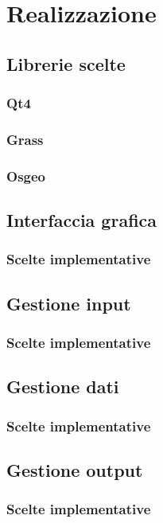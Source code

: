 
\chapter{Realizzazione}
\label{cap:realizzazione}

\section{Librerie scelte}

\subsection{Qt4}

\subsection{Grass}

\subsection{Osgeo}

\section{Interfaccia grafica}

\subsection{Scelte implementative}

\section{Gestione input}

\subsection{Scelte implementative}

\section{Gestione dati}

\subsection{Scelte implementative}

\section{Gestione output}

\subsection{Scelte implementative}
